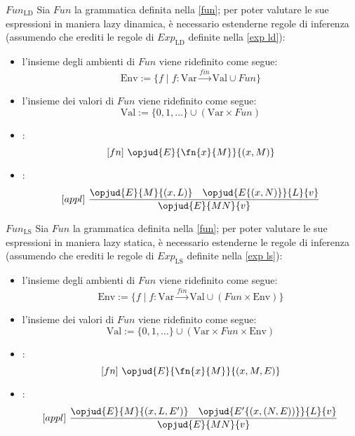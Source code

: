 \documentclass[a4paper, 12pt]{report}
\begin{document}
    \begin{framedprop}[breakable]{$Fun_\mathrm{LD}$}
        Sia $Fun$ la grammatica definita nella \cref{fun}; per poter valutare le sue espressioni in maniera lazy dinamica, è necessario estenderne regole di inferenza (assumendo che erediti le regole di $Exp_\mathrm{LD}$ definite nella \cref{exp ld}):

        \begin{itemize}
            \item l'insieme degli ambienti di $Fun$ viene ridefinito come segue: $$\mathrm{Env} := \{ f \mid f: \mathrm{Var} \xrightarrow{fin} \mathrm{Val} \cup Fun \}$$
            \item l'insieme dei valori di $Fun$ viene ridefinito come segue: $$\mathrm{Val} := \{  0, 1, \ldots \} \cup (\mathrm{Var} \times Fun)$$
            \item {}: $$[fn] \ \opjud{E}{\fn{x}{M}}{(x,M)}$$
            \item {}: $$[appl] \ \dfrac{\opjud{E}{M}{(x,L)} \quad \opjud{E\{(x,N)\}}{L}{v}}{\opjud{E}{MN}{v}}$$
        \end{itemize}
    \end{framedprop}

    \begin{framedprop}{$Fun_\mathrm{LS}$}
        Sia $Fun$ la grammatica definita nella \cref{fun}; per poter valutare le sue espressioni in maniera lazy statica, è necessario estenderne le regole di inferenza (assumendo che erediti le regole di $Exp_\mathrm{LS}$ definite nella \cref{exp ls}):

        \begin{itemize}
            \item l'insieme degli ambienti di $Fun$ viene ridefinito come segue: $$\mathrm{Env} := \{f \mid f :\mathrm{Var} \xrightarrow{fin} \mathrm{Val} \cup (Fun \times \mathrm{Env})\}$$
            \item l'insieme dei valori di $Fun$ viene ridefinito come segue: $$\mathrm{Val} := \{ 0, 1, \ldots\} \cup (\mathrm{Var} \times Fun \times \mathrm{Env})$$
            \item {}: $$[fn] \ \opjud{E}{\fn{x}{M}}{(x,M,E)}$$
            \item {}: $$[appl] \ \dfrac{\opjud{E}{M}{(x,L,E')} \quad \opjud{E'\{(x,(N,E))\}}{L}{v}}{\opjud{E}{MN}{v}}$$
        \end{itemize}
    \end{framedprop}
\end{document}
